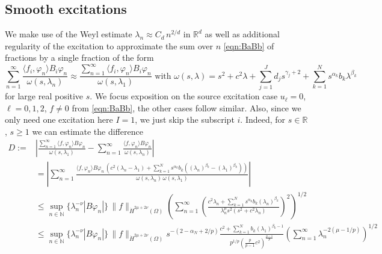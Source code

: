 \subsection{Smooth excitations}

We make use of the Weyl estimate $\lambda_n \approx C_d\, n^{2/d}$ in
$\mathbb{R}^d$ as well as additional regularity of the excitation to approximate
the sum over $n$ \eqref{eqn:BaBb} of fractions by a single fraction of the form
\[
\sum_{n=1}^\infty \frac{\langle f_{i},\varphi_n\rangle B_i\varphi_n}{\omega(s,\lambda_n)}
\approx\frac{\sum_{n=1}^\infty\langle f_{i},\varphi_n\rangle B_i\varphi_n}{\omega(s,\lambda_1)}
\mbox{ with } \omega(s,\lambda) = s^2+c^2\lambda+\sum_{j=1}^J d_j s^{\gamma_j+2}+\sum_{k=1}^N s^{\alpha_k} b_{k}\lambda^{\beta_{k}}
\] 
for large real positive $s$.
We focus exposition on the source excitation case $u_\ell=0$, $\ell=0,1,2$, $f\neq0$ from \eqref{eqn:BaBb}, the other cases follow similar. Also, since we only need one excitation here $I=1$, we just skip the subscript $i$.
Indeed, for $s\in\mathbb{R}$, $s\geq1$ we can estimate the difference
\[
\begin{aligned}
D:=&\left|
\frac{\sum_{n=1}^\infty\langle f,\varphi_n\rangle B\varphi_n}{\omega(s,\lambda_1)}-
\sum_{n=1}^\infty \frac{\langle f,\varphi_n\rangle B\varphi_n}{\omega(s,\lambda_n)}
\right|\\
&=\left|\sum_{n=1}^\infty
\frac{\langle f,\varphi_n\rangle B\varphi_n\,(c^2(\lambda_n-\lambda_1)+\sum_{k=1}^N s^{\alpha_k} b_{k}((\lambda_n)^{\beta_{k}}-(\lambda_1)^{\beta_{k}}))}{\omega(s,\lambda_n)\, \omega(s,\lambda_1)}\right|\\
&\leq \sup_{n\in\mathbb{N}} \{\lambda_n^{-\nu}|B\varphi_n|\}\, 
\|f\|_{\dot{H}^{2\mu+2\nu}(\Omega)}
\left(\sum_{n=1}^\infty\left(
\frac{c^2\lambda_n+\sum_{k=1}^N s^{\alpha_k} b_{k}(\lambda_n)^{\beta_{k}}}{
\lambda_n^\mu s^2(s^2+c^2\lambda_n)}\right)^2\right)^{\!1/2}\\ 
&\leq \sup_{n\in\mathbb{N}} \{\lambda_n^{-\nu}|B\varphi_n|\}\, 
\|f\|_{\dot{H}^{2\mu+2\nu}(\Omega)}
s^{-(2-\alpha_N+2/p)} \frac{c^2+\sum_{k=1}^N b_{k}(\lambda_1)^{\beta_{k}-1}}{
p^{1/p}(\tfrac{p}{p-1}c^2)^{\frac{p-1}{p}}}
\left(\sum_{n=1}^\infty\lambda_n^{-2(\mu-1/p)}\right)^{\!1/2} 
\end{aligned}
\]
